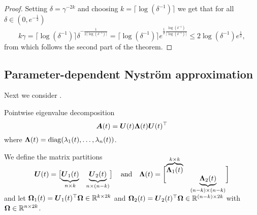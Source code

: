 \documentclass[12pt]{article}
\begin{document}
\begin{proof}
    Setting $\delta = \gamma^{-2 k}$ and choosing $k = \lceil \log(\delta^{-1}) \rceil$ we get that for all $\delta \in (0, e^{-\frac{1}{2}})$
    \begin{equation}
        k \gamma = \lceil \log(\delta^{-1}) \rceil \delta^{-\frac{1}{2\lceil \log(\delta^{-1}) \rceil}}
        = \lceil \log(\delta^{-1}) \rceil e^{\frac{1}{2}\frac{\log(\delta^{-1})}{\lceil \log(\delta^{-1}) \rceil}}
        \leq 2 \log(\delta^{-1}) e^{\frac{1}{2}},
    \end{equation}
    from which follows the second part of the theorem.
\end{proof}


\subsection{Parameter-dependent Nyström approximation}
\label{subsec:nystrom}

Next we consider . 

Pointwise eigenvalue decomposition
\begin{equation}
    \boldsymbol{A}(t) 
    = \boldsymbol{U}(t) \boldsymbol{\Lambda}(t) \boldsymbol{U}(t)^{\top} 
\end{equation}
where $\boldsymbol{\Lambda}(t) = \operatorname{diag}(\lambda_1(t), \dots, \lambda_n(t))$.

We define the matrix partitions
\begin{equation}
    \rule[\dimexpr-2ex-\ht\strutbox]{0pt}{\dimexpr2ex+2ex+\baselineskip}
    \mtx{U}(t) = \begin{bmatrix}
        \smash{\underbrace{\mtx{U}_1(t)}_{n \times k}} & \smash{\underbrace{\mtx{U}_2(t)}_{n \times (n-k)}}
    \end{bmatrix}
    \quad \text{and} \quad
    \mtx{\Lambda}(t) =
    \begin{bmatrix}
        \smash{\overbrace{\mtx{\Lambda}_1(t)}^{k \times k}} & \\ & \smash{\underbrace{\mtx{\Lambda}_2(t)}_{(n-k) \times (n-k)}}
    \end{bmatrix}
\end{equation}
and let $\boldsymbol{\Omega}_1(t) = \boldsymbol{U}_1(t)^{\top} \boldsymbol{\Omega} \in \mathbb{R}^{k \times 2k}$ and $\boldsymbol{\Omega}_2(t) = \boldsymbol{U}_2(t)^{\top} \boldsymbol{\Omega} \in \mathbb{R}^{(n - k) \times 2k}$ with $\boldsymbol{\Omega} \in \mathbb{R}^{n \times 2k}$.
\end{document}

